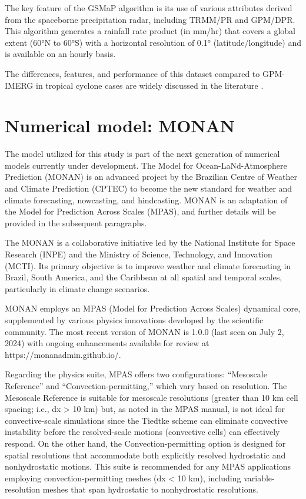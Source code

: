 The key feature of the GSMaP algorithm is its use of various attributes derived from the spaceborne precipitation radar, including TRMM/PR and GPM/DPR. This algorithm generates a rainfall rate product (in mm/hr) that covers a global extent (60°N to 60°S) with a horizontal resolution of 0.1° (latitude/longitude) and is available on an hourly basis.

The differences, features, and performance of this dataset compared to GPM-IMERG in tropical cyclone cases are widely discussed in the literature \cite{reddy2022accurately, bagtasa2022assessment, yang2024evaluation}.

\section{Numerical model: MONAN}

The model utilized for this study is part of the next generation of numerical models currently under development. The Model for Ocean-LaNd-Atmosphere Prediction (MONAN) is an advanced project by the Brazilian Centre of Weather and Climate Prediction (CPTEC) to become the new standard for weather and climate forecasting, nowcasting, and hindcasting. MONAN is an adaptation of the Model for Prediction Across Scales (MPAS), and further details will be provided in the subsequent paragraphs. 

The MONAN is a collaborative initiative led by the National Institute for Space Research (INPE) and the Ministry of Science, Technology, and Innovation (MCTI). Its primary objective is to improve weather and climate forecasting in Brazil, South America, and the Caribbean at all spatial and temporal scales, particularly in climate change scenarios.
 
MONAN employs an MPAS (Model for Prediction Across Scales) dynamical core, supplemented by various physics innovations developed by the scientific community. The most recent version of MONAN is 1.0.0 (last seen on July 2, 2024) with ongoing enhancements available for review at https://monanadmin.github.io/.
 
Regarding the physics suite, MPAS offers two configurations: “Mesoscale Reference” and “Convection-permitting,” which vary based on resolution. The Mesoscale Reference is suitable for mesoscale resolutions (greater than 10 km cell spacing; i.e., dx > 10 km) but, as noted in the MPAS manual, is not ideal for convective-scale simulations since the Tiedtke scheme can eliminate convective instability before the resolved-scale motions (convective cells) can effectively respond. On the other hand, the Convection-permitting option is designed for spatial resolutions that accommodate both explicitly resolved hydrostatic and nonhydrostatic motions. This suite is recommended for any MPAS applications employing convection-permitting meshes (dx < 10 km), including variable-resolution meshes that span hydrostatic to nonhydrostatic resolutions.
 
